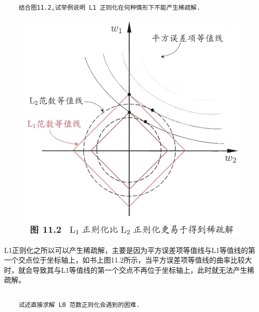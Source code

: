 \documentclass[UTF8,a4paper,AutoFakeBold,AutoFakeSlant]{article}
\begin{document}
\subsection{}

\begin{mdframed}[hidealllines=true,backgroundcolor=shadecolor]
  \begin{verbatim}
    结合图11.2,试举例说明 L1 正则化在何种情形下不能产生稀疏解.
  \end{verbatim}
\end{mdframed}

\begin{figure}[H]
  \centering
  \includegraphics[scale=0.3]{./引用/11.2.png}
  \label{f11.2}
\end{figure}

L1正则化之所以可以产生稀疏解，主要是因为平方误差项等值线与L1等值线的第一个交点位于坐标轴上，如书上图11.2所示，当平方误差项等值线的曲率比较大时，就会导致其与L1等值线的第一个交点不再位于坐标轴上，此时就无法产生稀疏解。



\subsection{}

\begin{mdframed}[hidealllines=true,backgroundcolor=shadecolor]
  \begin{verbatim}
    试述直接求解 L0 范数正则化会遇到的困难.
  \end{verbatim}
\end{mdframed}
\end{document}
